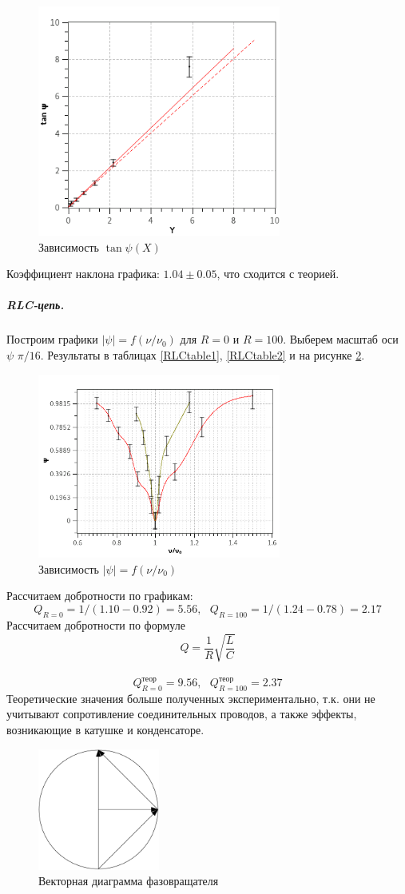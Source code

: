 \documentclass{article}
\begin{document}
   
   \begin{figure}[h]
   \centering
   \includegraphics[width=8cm]{plot2.png} 
   \caption{Зависимость $\tan \psi (X)$} 
   \label{plot2} 
   \end{figure}
   Коэффициент наклона графика: $1.04 \pm 0.05$, что сходится с теорией.

   \subparagraph*{RLC-цепь.}
   Построим графики $| \psi | = f(\nu / \nu_0)$ для $R = 0$ и $R = 100$. Выберем масштаб оси $\psi$ $\pi / 16$. Результаты в таблицах \ref{RLCtable1}, \ref{RLCtable2} и на рисунке \ref{plot3}.

   
   
   \begin{figure}[h]
   \centering
   \includegraphics[width=8cm]{plot3.png} 
   \caption{Зависимость $| \psi | = f(\nu / \nu_0)$} 
   \label{plot3} 
   \end{figure} 

   Рассчитаем добротности по графикам:
   \[
     Q_{R = 0} = 1/(1.10 - 0.92) = 5.56,~~~ Q_{R = 100} = 1/(1.24 - 0.78) = 2.17
   \]
   Рассчитаем добротности по формуле
   \[
     Q = \frac{1}{R}\sqrt{\frac{L}{C}}
   \]~\[
     Q_{R = 0}^{\text{теор}} = 9.56,~~~ Q_{R = 100}^{\text{теор}} = 2.37
   \]
   Теоретические значения больше полученных экспериментально, т.к. они не учитывают сопротивление соединительных проводов, а также эффекты, возникающие в катушке и конденсаторе.

   \begin{figure}[h]
   \centering
   \includegraphics[width=4cm]{fig5.png} 
   \caption{Векторная диаграмма фазовращателя} 
   \label{fig1} 
   \end{figure} 
\end{document}
